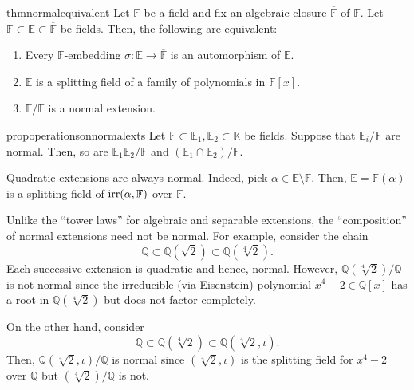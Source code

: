 \begin{restatable}[]{thm}{normalequivalent}
\label{thm:normalequivalent}
    Let $\mathbb{F}$ be a field and fix an algebraic closure $\overline{\mathbb{F}}$ of $\mathbb{F}.$ Let $\mathbb{F} \subset \mathbb{E} \subset \overline{\mathbb{F}}$ be fields. Then, the following are equivalent:
    \begin{enumerate}
         \item \label{item:001} Every $\mathbb{F}$-embedding $\sigma : \mathbb{E} \to \overline{\mathbb{F}}$ is an automorphism of $\mathbb{E}.$
         \item \label{item:002} $\mathbb{E}$ is a splitting field of a family of polynomials in $\mathbb{F}[x].$
         \item \label{item:003} $\mathbb{E}/\mathbb{F}$ is a normal extension. \hfill\hyperref[thm:normalequivalent2]{\downsym}
     \end{enumerate} 
\end{restatable}

\begin{restatable}[]{prop}{operationsonnormalexts}
\label{prop:operationsonnormalexts}
    Let $\mathbb{F} \subset \mathbb{E}_1, \mathbb{E}_2 \subset \mathbb{K}$ be fields. Suppose that $\mathbb{E}_i/\mathbb{F}$ are normal. Then, so are $\mathbb{E}_1\mathbb{E}_2/\mathbb{F}$ and $(\mathbb{E}_1 \cap \mathbb{E}_2)/\mathbb{F}.$ \hfill\hyperref[prop:operationsonnormalexts2]{\downsym}
\end{restatable}

\begin{ex}
    Quadratic extensions are always normal. Indeed, pick $\alpha \in \mathbb{E} \setminus \mathbb{F}.$ Then, $\mathbb{E} = \mathbb{F}(\alpha)$ is a splitting field of $\operatorname{irr}(\alpha, \mathbb{F})$ over $\mathbb{F}.$
\end{ex}

\begin{rem}
    Unlike the ``tower laws'' for algebraic and separable extensions, the ``composition'' of normal extensions need not be normal. For example, consider the chain
    \begin{equation*} 
        \mathbb{Q} \subset \mathbb{Q}(\sqrt{2}) \subset \mathbb{Q}(\sqrt[4]{2}).
    \end{equation*}
    Each successive extension is quadratic and hence, normal. However, $\mathbb{Q}(\sqrt[4]{2})/\mathbb{Q}$ is not normal since the irreducible (via Eisenstein) polynomial $x^4 - 2 \in \mathbb{Q}[x]$ has a root in $\mathbb{Q}(\sqrt[4]{2})$ but does not factor completely.

    On the other hand, consider
    \begin{equation*} 
        \mathbb{Q} \subset \mathbb{Q}(\sqrt[4]{2}) \subset \mathbb{Q}(\sqrt[4]{2}, \iota).
    \end{equation*}
    Then, $\mathbb{Q}(\sqrt[4]{2}, \iota)/\mathbb{Q}$ is normal since $(\sqrt[4]{2}, \iota)$ is the splitting field for $x^4 - 2$ over $\mathbb{Q}$ but $(\sqrt[4]{2})/\mathbb{Q}$ is not.
\end{rem}

